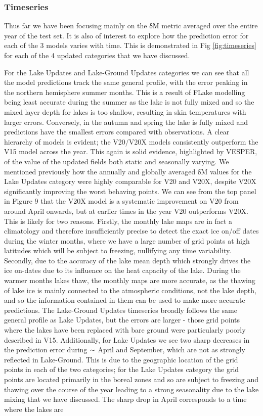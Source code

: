 \documentclass[hess, twostagejnl]{copernicus}
\begin{document}
\subsubsection{Timeseries}
Thus far we have been focusing mainly on the δM metric averaged over the entire year of the test set. It is also of interest to explore how the prediction error for each of the 3 models varies with time. This is demonstrated in Fig \ref{fig:timeseries} for each of the 4 updated categories that we have discussed. \newline 

\noindent For the Lake Updates and Lake-Ground Updates categories we can see that all the model predictions track the same general profile, with the error peaking in the northern hemisphere summer months. This is a result of FLake modelling being least accurate during the summer as the lake is not fully mixed and so the mixed layer depth for lakes is too shallow, resulting in skin temperatures with larger errors. Conversely, in the autumn and spring the lake is fully mixed and predictions have the smallest errors compared with observations. A clear hierarchy of models is evident; the V20/V20X models consistently outperform the V15 model across the year. This again is solid evidence, highlighted by VESPER, of the value of the updated fields both static and seasonally varying. We mentioned previously how the annually and globally averaged δM values for the Lake Updates category were highly comparable for V20 and V20X, despite V20X significantly improving the worst behaving points. We can see from the top panel in Figure 9 that the V20X model is a systematic improvement on V20 from around April onwards, but at earlier times in the year V20 outperforms V20X. This is likely for two reasons. Firstly, the monthly lake maps are in fact a climatology and therefore insufficiently precise to detect the exact ice on/off dates during the winter months, where we have a large number of grid points at high latitudes which will be subject to freezing, nullifying any time variability. Secondly, due to the accuracy of the lake mean depth which strongly drives the ice on-dates due to its influence on the heat capacity of the lake. During the warmer months lakes thaw, the monthly maps are more accurate, as the thawing of lake ice is mainly connected to the atmospheric conditions, not the lake depth, and so the information contained in them can be used to make more accurate predictions. The Lake-Ground Updates timeseries broadly follows the same general profile as Lake Updates, but the errors are larger - those grid points where the lakes have been replaced with bare ground were particularly poorly described in V15. Additionally, for Lake Updates we see two sharp decreases in the prediction error during ∼ April and September, which are not as strongly reflected in Lake-Ground. This is due to the geographic location of the grid points in each of the two categories; for the Lake Updates category the grid points are located primarily in the boreal zones and so are subject to freezing and thawing over the course of the year leading to a strong seasonality due to the lake mixing that we have discussed. The sharp drop in April corresponds to a time where the lakes are 
\end{document}
